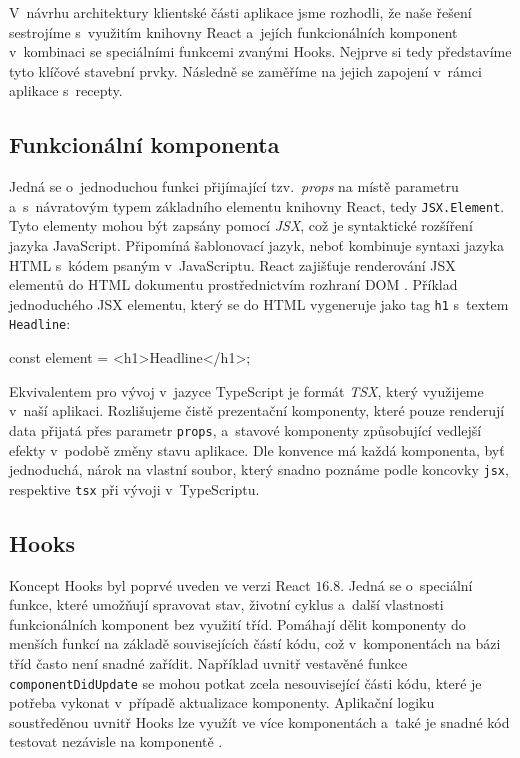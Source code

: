 V~návrhu architektury klientské části aplikace jsme rozhodli, že naše řešení sestrojíme s~využitím knihovny React a~jejích funkcionálních komponent v~kombinaci se speciálními funkcemi zvanými Hooks. Nejprve si tedy představíme tyto klíčové stavební prvky. Následně se zaměříme na jejich zapojení v~rámci aplikace s~recepty.

\subsection{Funkcionální komponenta}

Jedná se o~jednoduchou funkci přijímající tzv.~\emph{props} na místě parametru a~s~návratovým typem základního elementu knihovny React, tedy \texttt{JSX.Element}. Tyto elementy mohou být zapsány pomocí \emph{JSX}, což je syntaktické rozšíření jazyka JavaScript. Připomíná šablonovací jazyk, neboť kombinuje syntaxi jazyka HTML s~kódem psaným v~JavaScriptu. React zajišťuje renderování JSX elementů do HTML dokumentu prostřednictvím rozhraní DOM \citep{jsx-intro}. Příklad jednoduchého JSX elementu, který se do HTML vygeneruje jako tag \texttt{h1} s~textem \texttt{Headline}:

\begin{code}
const element = <h1>Headline</h1>;
\end{code}

Ekvivalentem pro vývoj v~jazyce TypeScript je formát \emph{TSX}, který využijeme v~naší aplikaci. Rozlišujeme čistě prezentační komponenty, které pouze renderují data přijatá přes parametr \texttt{props}, a~stavové komponenty způsobující vedlejší efekty v~podobě změny stavu aplikace. Dle konvence má každá komponenta, byť jednoduchá, nárok na vlastní soubor, který snadno poznáme podle koncovky \texttt{jsx}, respektive \texttt{tsx} při vývoji v~TypeScriptu.

\subsection{Hooks}

Koncept Hooks byl poprvé uveden ve verzi React $16.8$. Jedná se o~speciální funkce, které umožňují spravovat stav, životní cyklus a~další vlastnosti funkcionálních komponent bez využití tříd. Pomáhají dělit komponenty do menších funkcí na základě souvisejících částí kódu, což v~komponentách na bázi tříd často není snadné zařídit. Například uvnitř vestavěné funkce \texttt{componentDidUpdate} se mohou potkat zcela nesouvisející části kódu, které je potřeba vykonat v~případě aktualizace komponenty. Aplikační logiku soustředěnou uvnitř Hooks lze využít ve více komponentách a~také je snadné kód testovat nezávisle na komponentě \citep{react-hooks}.

